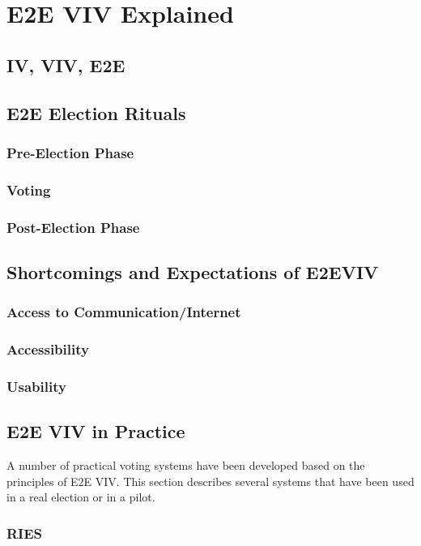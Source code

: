 \chapter{E2E VIV Explained}
\label{chapter:e2e_viv_explained}

\section{IV, VIV, E2E}
\section{E2E Election Rituals}
\subsection{Pre-Election Phase}
\subsection{Voting}
\subsection{Post-Election Phase}
\section{Shortcomings and Expectations of E2EVIV}
\subsection{Access to Communication/Internet}
\subsection{Accessibility}
\subsection{Usability}
\section{E2E VIV in Practice}
A number of practical voting systems have been developed based on the
principles of E2E VIV. This section describes several systems that
have been used in a real election or in a pilot.

\subsection{RIES~\cite{hubbers2004}}

